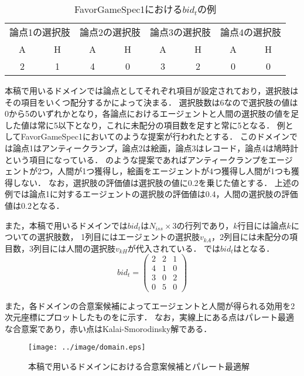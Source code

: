 \begin{table}[!tb]
  \centering
  \caption{FavorGameSpec1における$bid_t$の例}
  \begin{tabular}{cccccccc} \toprule
      \multicolumn{2}{c}{論点1の選択肢} & \multicolumn{2}{c}{論点2の選択肢} & \multicolumn{2}{c}{論点3の選択肢} & \multicolumn{2}{c}{論点4の選択肢} \\
      A & H & A & H & A & H & A & H \\ \midrule
      2 & 1 & 4 & 0 & 3 & 2 & 0 & 0 \\ \bottomrule
  \end{tabular}
  \label{tab:bid_ex}
\end{table}

本稿で用いるドメインでは論点としてそれぞれ項目が設定されており，選択肢はその項目をいくつ配分するかによって決まる．
選択肢数は6なので選択肢の値は0から5のいずれかとなり，各論点におけるエージェントと人間の選択肢の値を足した値は常に5以下となり，これに未配分の項目数を足すと常に5となる．
例としてFavorGameSpec1においてのような提案が行われたとする．
このドメインでは論点1はアンティークランプ，論点2は絵画，論点3はレコード，論点4は鳩時計という項目になっている．
のような提案であればアンティークランプをエージェントが2つ，人間が1つ獲得し，絵画をエージェントが4つ獲得し人間が1つも獲得しない．
なお，選択肢の評価値は選択肢の値に0.2を乗じた値とする．
上述の例では論点1に対するエージェントの選択肢の評価値は0.4，人間の選択肢の評価値は0.2となる．

また，本稿で用いるドメインでは$bid_t$は$N_{iss} \times 3$の行列であり，$k$行目には論点$k$についての選択肢数，
1列目にはエージェントの選択肢$v_{kA}$，2列目には未配分の項目数，3列目には人間の選択肢$v_{kH}$が代入されている．
では$bid_t$はとなる．
\begin{equation}
    bid_t = \left(
    \begin{array}{rrr}
        2 & 2 & 1 \\
        4 & 1 & 0 \\
        3 & 0 & 2 \\
        0 & 5 & 0
    \end{array}
    \right)
    \label{eq:bid_ex}
\end{equation}

また，各ドメインの合意案候補によってエージェントと人間が得られる効用を2次元座標にプロットしたものをに示す．
なお，実線上にある点はパレート最適な合意案であり，赤い点はKalai-Smorodinsky解である．

\begin{figure}[tb]
  \centering
  \texttt{[image: ../image/domain.eps]}
  \caption{本稿で用いるドメインにおける合意案候補とパレート最適解}
  \label{fig:domain}
\end{figure}

